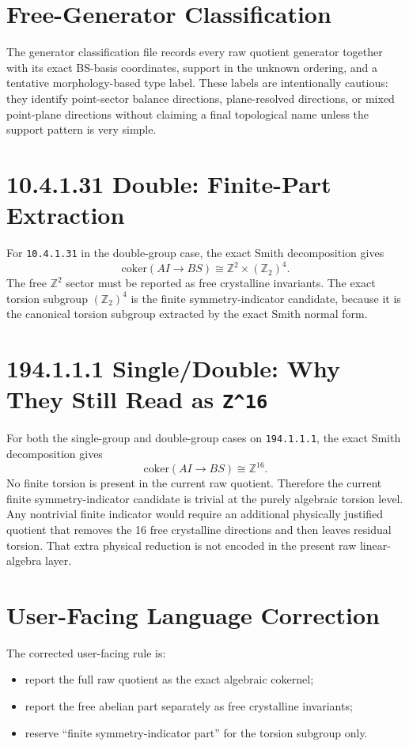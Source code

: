 \documentclass[11pt]{article}
\begin{document}
        \section{Free-Generator Classification}
        The generator classification file records every raw quotient generator together with its exact BS-basis coordinates,
        support in the unknown ordering, and a tentative morphology-based type label.  These labels are intentionally cautious:
        they identify point-sector balance directions, plane-resolved directions, or mixed point-plane directions without claiming a final topological name unless the support pattern is very simple.

        \section{10.4.1.31 Double: Finite-Part Extraction}
        For \texttt{10.4.1.31} in the double-group case, the exact Smith decomposition gives
        \[
          \mathrm{coker}(AI \to BS) \cong \mathbb{Z}^2 \times (\mathbb{Z}_2)^4.
        \]
        The free $\mathbb{Z}^2$ sector must be reported as free crystalline invariants.
        The exact torsion subgroup $(\mathbb{Z}_2)^4$ is the finite symmetry-indicator candidate, because it is the canonical torsion subgroup extracted by the exact Smith normal form.

        \section{194.1.1.1 Single/Double: Why They Still Read as \texttt{Z\textasciicircum{}16}}
        For both the single-group and double-group cases on \texttt{194.1.1.1}, the exact Smith decomposition gives
        \[
          \mathrm{coker}(AI \to BS) \cong \mathbb{Z}^{16}.
        \]
        No finite torsion is present in the current raw quotient.  Therefore the current finite symmetry-indicator candidate is trivial at the purely algebraic torsion level.
        Any nontrivial finite indicator would require an additional physically justified quotient that removes the 16 free crystalline directions and then leaves residual torsion.  That extra physical reduction is not encoded in the present raw linear-algebra layer.

        \section{User-Facing Language Correction}
        The corrected user-facing rule is:
        \begin{itemize}
        \item report the full raw quotient as the exact algebraic cokernel;
        \item report the free abelian part separately as free crystalline invariants;
        \item reserve ``finite symmetry-indicator part'' for the torsion subgroup only.
        \end{itemize}
\end{document}
